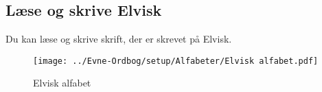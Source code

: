 \subsection{Læse og skrive Elvisk}
Du kan læse og skrive skrift, der er skrevet på Elvisk.\\
\begin{figure}[H]
    \centering
    \texttt{[image: ../Evne-Ordbog/setup/Alfabeter/Elvisk alfabet.pdf]}
    \caption{Elvisk alfabet}
\end{figure}

